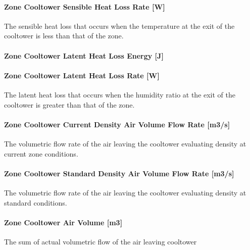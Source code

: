 \paragraph{Zone Cooltower Sensible Heat Loss Rate {[}W{]}}\label{zone-cooltower-sensible-heat-loss-rate-w}

The sensible heat loss that occurs when the temperature at the exit of the cooltower is less than that of the zone.

\paragraph{Zone Cooltower Latent Heat Loss Energy {[}J{]}}\label{zone-cooltower-latent-heat-loss-energy-j}

\paragraph{Zone Cooltower Latent Heat Loss Rate {[}W{]}}\label{zone-cooltower-latent-heat-loss-rate-w}

The latent heat loss that occurs when the humidity ratio at the exit of the cooltower is greater than that of the zone.

\paragraph{Zone Cooltower Current Density Air Volume Flow Rate {[}m3/s{]}}\label{zone-cooltower-air-current-density-volumetric-flow-rate-m3s}

The volumetric flow rate of the air leaving the cooltower evaluating density at current zone conditions.

\paragraph{Zone Cooltower Standard Density Air Volume Flow Rate {[}m3/s{]}}\label{zone-cooltower-air-standard-density-volumetric-flow-rate-m3s}

The volumetric flow rate of the air leaving the cooltower evaluating density at standard conditions.

\paragraph{Zone Cooltower Air Volume {[}m3{]}}\label{zone-cooltower-air-volume-m3}

The sum of actual volumetric flow of the air leaving cooltower

